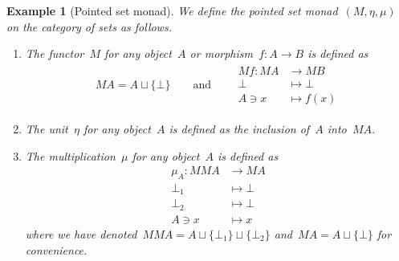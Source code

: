 \documentclass[a4paper]{article}
\theoremstyle{plain}
\newtheorem{example}[theorem]{Example}
\theoremstyle{definition}
\begin{document}
\begin{example}[Pointed set monad]
    \label{monad:maybe}
    We define the pointed set monad~\((M,\eta,\mu)\) on the category of
    sets as follows.
    \begin{enumerate}
        \item The functor~\(M\) for any object~\(A\) or
            morphism~\(f:A\longrightarrow B\) is defined as
            \begin{gather*}
                MA = A\sqcup\{\bot\}
                \qquad\text{and}\qquad
                \begin{split}
                    Mf:MA&\longrightarrow MB \\
                    \bot&\longmapsto\bot \\
                    A\ni x&\longmapsto f(x)
                \end{split}
            \end{gather*}
        \item The unit~\(\eta\) for any object~\(A\) is defined as the inclusion
            of~\(A\) into~\(MA\).
        \item The multiplication~\(\mu\) for any object~\(A\) is defined as
            \begin{align*}
                \mu_{A}:MMA&\longrightarrow MA \\
                \bot_{1}&\longmapsto \bot \\
                \bot_{2}&\longmapsto \bot \\
                A\ni x&\longmapsto x
            \end{align*}
            where we have denoted~\(MMA=A\sqcup\{\bot_{1}\}\sqcup\{\bot_{2}\}\)
            and~\(MA=A\sqcup\{\bot\}\) for convenience.
    \end{enumerate}
\end{example}
\end{document}
